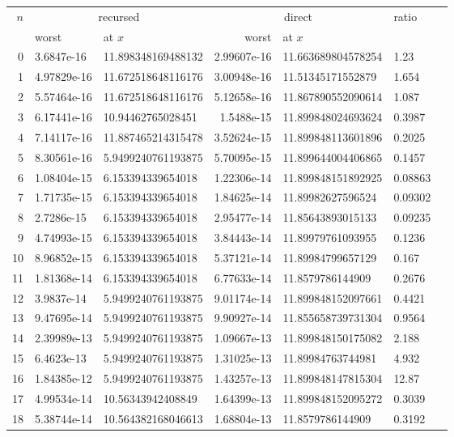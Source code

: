 \begin{tabular}{rllrllr}
\toprule
$n$ & \multicolumn{2}{c}{recursed} & \multicolumn{2}{c}{direct} & ratio\\
\cmidrule(lr){2-3}\cmidrule(lr){4-5}
 & worst & at $x$ & worst & at $x$ &\\
\midrule
 0 & 3.6847e-16 & 11.898348169488132 & 2.99607e-16 & 11.663689804578254 & 1.23\\
 1 & 4.97829e-16 & 11.672518648116176 & 3.00948e-16 & 11.51345171552879 & 1.654\\
 2 & 5.57464e-16 & 11.672518648116176 & 5.12658e-16 & 11.867890552090614 & 1.087\\
 3 & 6.17441e-16 & 10.94462765028451 & 1.5488e-15 & 11.899848024693624 & 0.3987\\
 4 & 7.14117e-16 & 11.887465214315478 & 3.52624e-15 & 11.899848113601896 & 0.2025\\
 5 & 8.30561e-16 & 5.9499240761193875 & 5.70095e-15 & 11.899644004406865 & 0.1457\\
 6 & 1.08404e-15 & 6.153394339654018 & 1.22306e-14 & 11.899848151892925 & 0.08863\\
 7 & 1.71735e-15 & 6.153394339654018 & 1.84625e-14 & 11.89982627596524 & 0.09302\\
 8 & 2.7286e-15 & 6.153394339654018 & 2.95477e-14 & 11.85643893015133 & 0.09235\\
 9 & 4.74993e-15 & 6.153394339654018 & 3.84443e-14 & 11.89979761093955 & 0.1236\\
10 & 8.96852e-15 & 6.153394339654018 & 5.37121e-14 & 11.89984799657129 & 0.167\\
11 & 1.81368e-14 & 6.153394339654018 & 6.77633e-14 & 11.8579786144909 & 0.2676\\
12 & 3.9837e-14 & 5.9499240761193875 & 9.01174e-14 & 11.899848152097661 & 0.4421\\
13 & 9.47695e-14 & 5.9499240761193875 & 9.90927e-14 & 11.855658739731304 & 0.9564\\
14 & 2.39989e-13 & 5.9499240761193875 & 1.09667e-13 & 11.899848150175082 & 2.188\\
15 & 6.4623e-13 & 5.9499240761193875 & 1.31025e-13 & 11.89984763744981 & 4.932\\
16 & 1.84385e-12 & 5.9499240761193875 & 1.43257e-13 & 11.899848147815304 & 12.87\\
17 & 4.99534e-14 & 10.56343942408849 & 1.64399e-13 & 11.899848152095272 & 0.3039\\
18 & 5.38744e-14 & 10.564382168046613 & 1.68804e-13 & 11.8579786144909 & 0.3192\\

\end{tabular}

